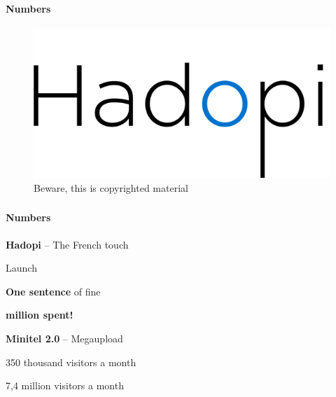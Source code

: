     \begin{frame}
      \frametitle{\subsecname}
      \framesubtitle{Numbers}

      \begin{figure}
        \centering
        \includegraphics[scale=1.7]{img/P3-Hadopi.jpg}
        \caption{Beware, this is copyrighted material}
      \end{figure}
    \end{frame}

    \begin{frame}
      \frametitle{\subsecname}
      \framesubtitle{Numbers}

      {\large\textbf{Hadopi} \footnotesize -- The French touch}
      \begin{description}[XXXX]
        \item[2009] Launch \pause
        \item[2012] \textbf{One sentence} of  fine \pause 
        \item[2013] \alert{\textbf{ million spent!}}
      \end{description} \pause
      \vspace{1em}

      {\large\textbf{Minitel 2.0} \footnotesize -- Megaupload}
      \begin{description}[XXXX]
        \item[2008] 350 thousand visitors a month \pause
        \item[2010] 7,4 million visitors a month
      \end{description}
    \end{frame}

